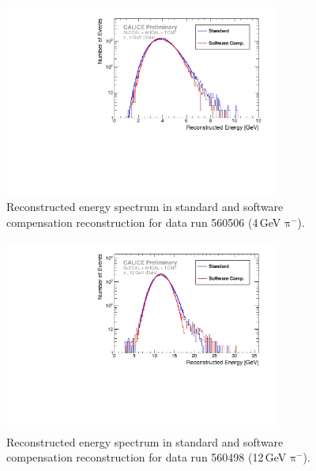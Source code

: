 \documentclass[twoside,a4paper,12pt]{article}
\newcommand\piminus{\(\mathrm{\pi^-}\)}
\begin{document}
\begin{appendix}
\clearpage
\begin{figure}[t]
\begin{center}
\includegraphics[width=0.8\textwidth]{fig/pion/SC/ERec_classic_SC_560506_data.pdf}
\caption{Reconstructed energy spectrum in standard and software compensation reconstruction for data run 560506 (4\,GeV \piminus).}
\label{fig:erec_pi_4gev}
\end{center}
\end{figure}

\begin{figure}[b]
\begin{center}
\includegraphics[width=0.8\textwidth]{fig/pion/SC/ERec_classic_SC_560498_data.pdf}
\caption{Reconstructed energy spectrum in standard and software compensation reconstruction for data run 560498 (12\,GeV \piminus).}
\label{fig:erec_pi_12gev}
\end{center}
\end{figure}


\end{appendix}
\end{document}
